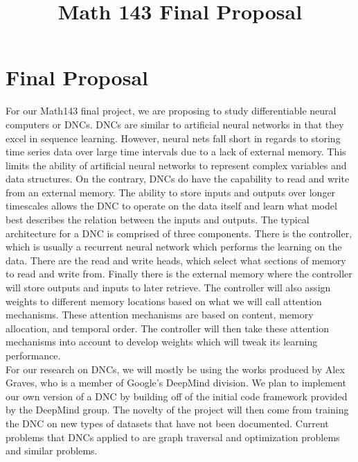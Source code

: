 \documentclass[11pt,letterpaper,cm]{hmcpset}
\title{Math 143 Final Proposal}
\begin{document}
\section{Final Proposal}
For our Math143 final project, we are proposing to study differentiable neural computers or DNCs.
DNCs are similar to artificial neural networks in that they excel in sequence learning. 
However, neural nets fall short in regards to storing time series data over large time intervals due to a lack of external memory.
This limits the ability of artificial neural networks to represent complex variables and data structures. 
On the contrary, DNCs do have the capability to read and write from an external memory.
The ability to store inputs and outputs over longer timescales allows the DNC to operate on the data itself and learn what model best describes the relation between the inputs and outputs.
The typical architecture for a DNC is comprised of three components.
There is the controller, which is usually a recurrent neural network which performs the learning on the data.
There are the read and write heads, which select what sections of memory to read and write from.
Finally there is the external memory where the controller will store outputs and inputs to later retrieve.
The controller will also assign weights to different memory locations based on what we will call attention mechanisms. 
These attention mechanisms are based on content, memory allocation, and temporal order.
The controller will then take these attention mechanisms into account to develop weights which will tweak its learning performance.
\\
\indent For our research on DNCs, we will mostly be using the works produced by Alex Graves, who is a member of Google's DeepMind division.
We plan to implement our own version of a DNC by building off of the initial code framework provided by the DeepMind group.
The novelty of the project will then come from training the DNC on new types of datasets that have not been documented. 
Current problems that DNCs applied to are graph traversal and optimization problems and similar problems.
\end{document}
